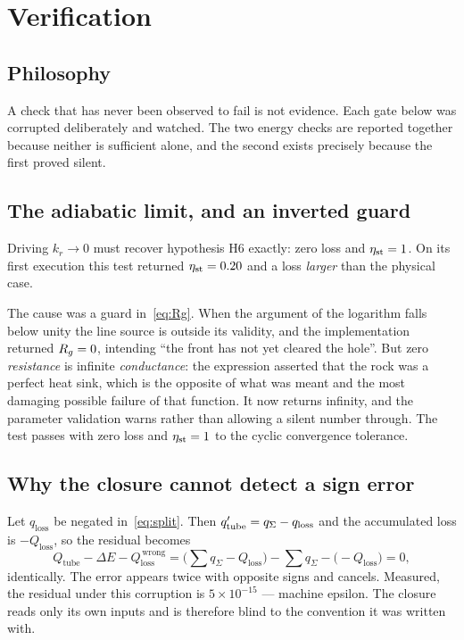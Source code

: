 \section{Verification}
\label{sec:gates}

\subsection{Philosophy}

A check that has never been observed to fail is not evidence. Each gate below
was corrupted deliberately and watched. The two energy checks are reported
together because neither is sufficient alone, and the second exists precisely
because the first proved silent.

\subsection{The adiabatic limit, and an inverted guard}

Driving $k_r \to 0$ must recover hypothesis H6 exactly: zero loss and
$\eta_{\mathrm{st}} = 1$. On its first execution this test returned $\eta_{\mathrm{st}} = 0.20$ and a
loss \emph{larger} than the physical case.

The cause was a guard in~\eqref{eq:Rg}. When the argument of the logarithm
falls below unity the line source is outside its validity, and the
implementation returned $R_{g} = 0$, intending ``the front has not yet cleared
the hole''. But zero \emph{resistance} is infinite \emph{conductance}: the
expression asserted that the rock was a perfect heat sink, which is the
opposite of what was meant and the most damaging possible failure of that
function. It now returns infinity, and the parameter validation warns rather
than allowing a silent number through. The test passes with zero loss and
$\eta_{\mathrm{st}} = 1$ to the cyclic convergence tolerance.

\subsection{Why the closure cannot detect a sign error}

Let $q_{\mathrm{loss}}$ be negated in~\eqref{eq:split}. Then
$q'_{\mathrm{tube}} = q_\Sigma - q_{\mathrm{loss}}$ and the accumulated loss
is $-Q_{\mathrm{loss}}$, so the residual becomes
\begin{equation}
Q_{\mathrm{tube}} - \Delta E - Q_{\mathrm{loss}}^{\,\mathrm{wrong}}
 = \big(\textstyle\sum q_\Sigma - Q_{\mathrm{loss}}\big)
   - \textstyle\sum q_\Sigma - \big(-Q_{\mathrm{loss}}\big) = 0 ,
\end{equation}
identically. The error appears twice with opposite signs and cancels. Measured,
the residual under this corruption is $5\times10^{-15}$ --- machine epsilon.
The closure reads only its own inputs and is therefore blind to the convention
it was written with.

